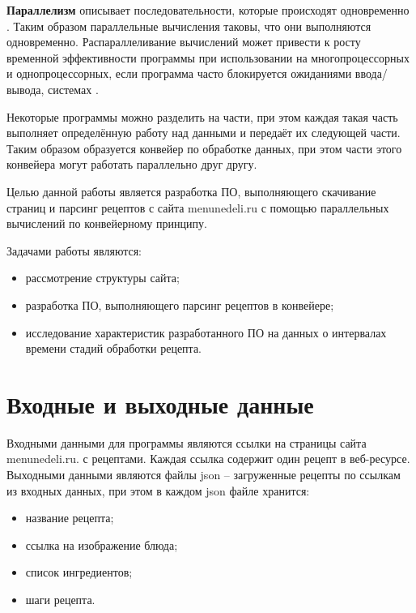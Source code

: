 
\textbf{Параллелизм} описывает последовательности, которые происходят одновременно \cite{posix-threads}. Таким образом параллельные вычисления таковы, что они выполняются одновременно. Распараллеливание вычислений может привести к росту временной эффективности программы при использовании на многопроцессорных и однопроцессорных, если программа часто блокируется ожиданиями ввода/вывода, системах \cite{tanenbaum}.

Некоторые программы можно разделить на части, при этом каждая такая часть выполняет определённую работу над данными и передаёт их следующей части. Таким образом образуется конвейер по обработке данных, при этом части этого конвейера могут работать параллельно друг другу.


Целью данной работы является разработка ПО, выполняющего скачивание страниц и парсинг рецептов с сайта menunedeli.ru с помощью параллельных вычислений по конвейерному принципу.

Задачами работы являются:

\begin{itemize}
	\item рассмотрение структуры сайта;
	\item разработка ПО, выполняющего парсинг рецептов в конвейере;
	\item исследование характеристик разработанного ПО на данных о интервалах времени стадий обработки рецепта.
\end{itemize}
\vspace{20mm}
{\let\clearpage\relax \chapter{Входные и выходные данные}}

Входными данными для программы являются ссылки на страницы сайта menunedeli.ru. с рецептами. Каждая ссылка содержит один рецепт в веб-ресурсе. Выходными данными являются файлы json -- загруженные рецепты по ссылкам из входных данных, при этом в каждом json файле хранится:

\begin{itemize}
	\item название рецепта;
	\item ссылка на изображение блюда;
	\item список ингредиентов;
	\item шаги рецепта.
\end{itemize}

